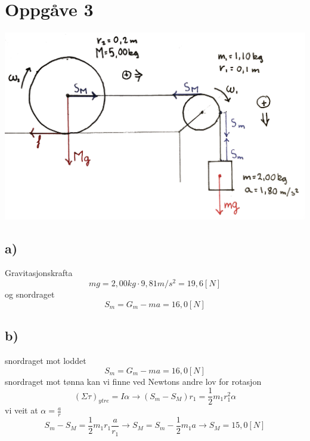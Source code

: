 \documentclass[12pt,a4paper]{article}
\begin{document}
  \section*{Oppgåve 3}
    \begin{center}
      \includegraphics[scale=0.7]{05_3}
    \end{center}
    \subsection*{a)}
    Gravitasjonskrafta
    \begin{equation}
      mg = 2,00kg \cdot 9,81m/s^2 = 19,6 [N]
    \end{equation}
    og snordraget
    \begin{equation}
      S_m = G_m - ma = 16,0[N]
    \end{equation}

    \subsection*{b)}
    snordraget mot loddet
    \begin{equation}
      S_m = G_m - ma = 16,0[N]
    \end{equation}
    snordraget mot tønna kan vi finne ved Newtons andre lov for rotasjon
    \begin{equation}
      (\Sigma \tau)_{ytre} = I\alpha \rightarrow
      (S_m - S_M)r_1 = \frac{1}{2}m_1r_1^2\alpha
    \end{equation}
    vi veit at $\alpha = \frac{a}{r}$
    \begin{equation}
      S_m - S_M = \frac{1}{2}m_1r_1\frac{a}{r_1} \rightarrow S_M = S_m - \frac{1}{2}m_1a
      \rightarrow S_M = 15,0[N]
    \end{equation}
\end{document}
